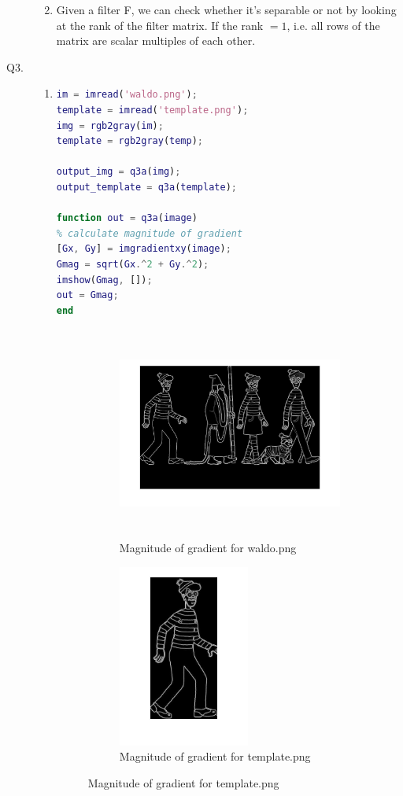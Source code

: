 \documentclass{csc_assignment4}
\begin{document}
\begin{description}
\begin{enumerate}[label=(\alph*)]
\vspace{4mm}
\item Given a filter F, we can check whether it's separable or not by looking at the rank of the filter matrix. If the rank $= 1$, i.e. all rows of the matrix are scalar multiples of each other.
\newpage
\end{enumerate}

\item[Q3.]
\begin{enumerate}[label=(\alph*)]
\item
\begin{lstlisting}[language=MATLAB]
% read image & convert to grayscale
im = imread('waldo.png');
template = imread('template.png');
img = rgb2gray(im);
template = rgb2gray(temp);

output_img = q3a(img);
output_template = q3a(template);

function out = q3a(image)
% calculate magnitude of gradient
[Gx, Gy] = imgradientxy(image);
Gmag = sqrt(Gx.^2 + Gy.^2);
imshow(Gmag, []);
out = Gmag;
end
\end{lstlisting}

\begin{figure}[h]
\centering
\begin{subfigure}{0.5\textwidth}
\centering
\includegraphics[width=1.2\linewidth, height=7cm]{q3a1.jpg}
\vspace{-10mm}
\caption{Magnitude of gradient for waldo.png}
\end{subfigure}
\begin{subfigure}{0.5\textwidth}
\centering
\includegraphics[width=0.5\linewidth, height=6cm]{q3a2.jpg}
\vspace{-5mm}
\caption{Magnitude of gradient for template.png}
\end{subfigure}
\end{figure}


\end{enumerate}
\end{description}
\end{document}
